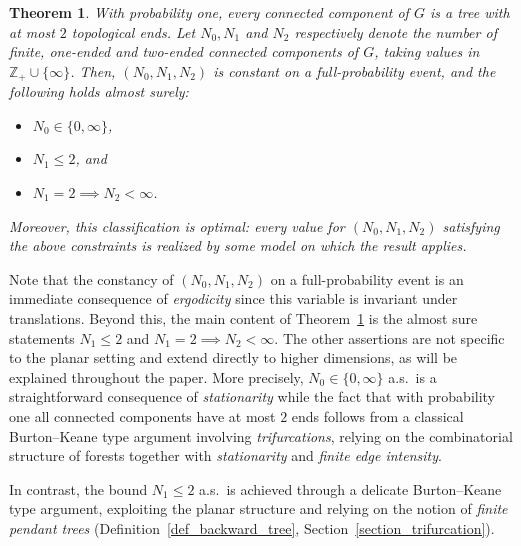 \documentclass[a4paper, 11pt]{article} %
\theoremstyle{plain}
\newtheorem{theoremI}{Theorem}
\newcommand{\Z}{\mathbb{Z}}
\newcommand{\1}{\mathds 1}
\numberwithin{equation}{section}
\begin{document}
\begin{theoremI}
    \label{thm_main_undirected}
    With probability one, every connected component of $G$ is a tree with at most $2$ topological ends. Let $N_0, N_1$ and $N_2$ respectively denote the number of finite, one-ended and two-ended connected components of $G$, taking values in $\Z_+\cup\{\infty\}$. Then, $(N_0,N_1,N_2)$ is constant on a full-probability event, and the following holds almost surely:
        \begin{itemize}
            \item $N_0\in\{0,\infty\}$,
            \item $N_1\leq 2$, and
            \item $N_1=2\implies N_2<\infty$.
        \end{itemize}
    Moreover, this classification is optimal: every value for $(N_0,N_1,N_2)$ satisfying the above constraints is realized by some model on which the result applies.
\end{theoremI}


Note that the constancy of $(N_0,N_1,N_2)$ on a full-probability event is an immediate consequence of \emph{ergodicity} since this variable is invariant under translations. Beyond this, the main content of Theorem~\ref{thm_main_undirected} is the almost sure statements $N_1\leq2$ and $N_1=2\implies N_2<\infty$. The other assertions are not specific to the planar setting and extend directly to higher dimensions, as will be explained throughout the paper. More precisely, $N_0\in\{0,\infty\}$ a.s.\ is a straightforward consequence of \emph{stationarity} while the fact that with probability one all connected components have at most $2$ ends follows from a classical Burton–Keane type argument involving \emph{trifurcations}, relying on the combinatorial structure of forests together with \emph{stationarity} and \emph{finite edge intensity}. 

In contrast, the bound $N_1\leq2$ a.s.\ is achieved through a delicate Burton–Keane type argument, exploiting the planar structure and relying on the notion of \emph{finite pendant trees} (Definition~\ref{def_backward_tree}, Section~\ref{section_trifurcation}). 
\end{document}
